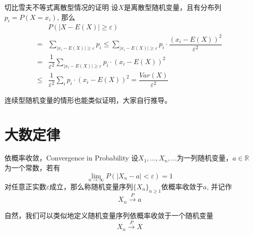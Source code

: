 
\begin{frame}

\begin{block}{切比雪夫不等式离散型情况的证明}
设$X$是离散型随机变量，且有分布列$p_i = P(X = x_i)$, 那么
\begin{align*}
& P(\vert X - E(X) \vert \ge \varepsilon) \\
= & \sum\limits_{\vert x_i - E(X) \vert \ge \varepsilon} p_i \le \sum\limits_{\vert x_i - E(X) \vert \ge \varepsilon} p_i \cdot \dfrac{(x_i - E(X))^2}{\varepsilon^2} \\
= & \dfrac{1}{\varepsilon^2} \sum\limits_{\vert x_i - E(X) \vert \ge \varepsilon} p_i \cdot (x_i - E(X))^2 \\
\le & \dfrac{1}{\varepsilon^2} \sum\limits_i p_i \cdot (x_i - E(X))^2 = \dfrac{Var(X)}{\varepsilon^2}
\end{align*}
\end{block}

\pause

连续型随机变量的情形也能类似证明，大家自行推导。

\end{frame}


\section{大数定律}


\begin{frame}

\begin{block}{依概率收敛，Convergence in Probability}
设$X_1,\ldots,X_n,\ldots$为一列随机变量，$a\in \mathbb{R}$为一个常数，若有
$$\lim\limits_{n\to\infty} P(\vert X_n - a \vert < \varepsilon) = 1$$
对任意正实数$\varepsilon$成立，那么称随机变量序列$\{X_n\}_{n\ge1}$依概率收敛于$a$, 并记作
$$X_n \xrightarrow{P} a$$

\pause

自然，我们可以类似地定义随机变量序列依概率收敛于一个随机变量
$$X_n \xrightarrow{P} X$$
\end{block}

\end{frame}


